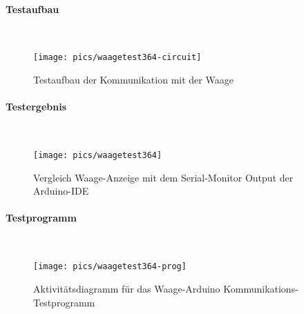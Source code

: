 \documentclass[12pt,a4paper]{article}
\begin{document}
\paragraph{Testaufbau}\mbox{}\\
\begin{figure}[h!]
	\centering
	\texttt{[image: pics/waagetest364-circuit]}
	\caption{Testaufbau der Kommunikation mit der Waage}
\end{figure}
%
\paragraph{Testergebnis}\mbox{}\\
\begin{figure}[h!]
	\centering
	\texttt{[image: pics/waagetest364]}
	\caption{Vergleich Waage-Anzeige mit dem Serial-Monitor Output der Arduino-IDE}
\end{figure}
%
\newpage
\paragraph{Testprogramm}\mbox{}\\
\begin{figure}[h!]
	\centering
	\texttt{[image: pics/waagetest364-prog]}
	\caption{Aktivitätsdiagramm für das Waage-Arduino Kommunikations-Testprogramm}
\end{figure}
%
\newpage
\end{document}
